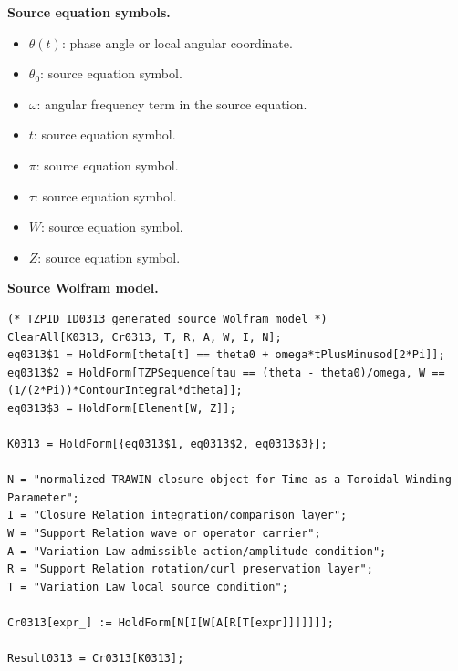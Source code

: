 \begin{minipage}[t]{0.49\linewidth}
\begingroup
\small
\raggedright
\textbf{Source equation symbols.}\par
\begin{itemize}[leftmargin=1.35em,itemsep=1pt,topsep=1pt,parsep=0pt]
    \item $\theta(t)$: phase angle or local angular coordinate.
    \item $\theta_{0}$: source equation symbol.
    \item $\omega$: angular frequency term in the source equation.
    \item $t$: source equation symbol.
    \item $\pi$: source equation symbol.
    \item $\tau$: source equation symbol.
    \item $W$: source equation symbol.
    \item $Z$: source equation symbol.
\end{itemize}
\endgroup
\end{minipage}\hfill
\begin{minipage}[t]{0.47\linewidth}
\begingroup
\scriptsize
\raggedright
\textbf{Source Wolfram model.}\par
\begin{Verbatim}[fontsize=\tiny,breaklines=true,breakanywhere=true]
(* TZPID ID0313 generated source Wolfram model *)
ClearAll[K0313, Cr0313, T, R, A, W, I, N];
eq0313$1 = HoldForm[theta[t] == theta0 + omega*tPlusMinusod[2*Pi]];
eq0313$2 = HoldForm[TZPSequence[tau == (theta - theta0)/omega, W == (1/(2*Pi))*ContourIntegral*dtheta]];
eq0313$3 = HoldForm[Element[W, Z]];

K0313 = HoldForm[{eq0313$1, eq0313$2, eq0313$3}];

N = "normalized TRAWIN closure object for Time as a Toroidal Winding Parameter";
I = "Closure Relation integration/comparison layer";
W = "Support Relation wave or operator carrier";
A = "Variation Law admissible action/amplitude condition";
R = "Support Relation rotation/curl preservation layer";
T = "Variation Law local source condition";

Cr0313[expr_] := HoldForm[N[I[W[A[R[T[expr]]]]]]];

Result0313 = Cr0313[K0313];
\end{Verbatim}
\endgroup
\end{minipage}

